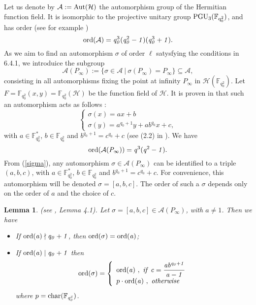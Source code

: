\documentclass[10pt]{article}
\newtheorem{lem1}{Lemma}[]
\newcommand{\s}{\vspace{0.3cm}}
\newcommand{\cd}{\cdot}
\newcommand{\calA}{\mathcal{A}}
\newcommand{\calH}{\mathcal{H}}
\newcommand{\su}{\subseteq}
\begin{document}
Let us denote by $\calA := \rm Aut(\calH)$ the automorphism group of the Hermitian function field. It is isomorphic to the projective unitary group $\rm PGU_3(\mathbb{F}_{q_0^2})$, and has order (see for example \cite{Sti})
\[\rm ord \it (\calA) =  q_0^{\rm 3}\it (q_0^{\rm 2}-1)(\it q_0^{\rm 3}+1).\]
As we aim to find an automorphism $\sigma$ of order $\ell$ satysfying the conditions in 6.4.1, we introduice the subgroup
\[\calA(P_{\infty}) := \{ \sigma \in \calA \ | \ \sigma(P_{\infty}) = P_{\infty}\} \su \calA ,\]
consisting in all automorphisms fixing the point at infinity $P_{\infty}$ in $\calH(\mathbb{F}_{q_0^2})$. Let $F=\mathbb{F}_{q_0^2}(x,y)=\mathbb{F}_{q_0^2}(\calH)$ be the function field of $\calH$. It is proven in \cite{Gar} that such an automorphism acts as follows :
\begin{equation} \label{sigma}
\left\{ \begin{array}{ll}
\sigma(x) = ax+b \\
\sigma(y) = a^{q_0+1}y+ab^{q_0}x+c,
\end{array} \right.
\end{equation}
with $a \in \mathbb{F}_{q_0^2}^*$, $b \in \mathbb{F}_{q_0^2}$ and $b^{q_0+1} = c^{q_0}+c$ (see (2.2) in \cite{Gar}). We have 
\[\rm ord \it (\calA(P_{\infty})) = q^{\rm 3}\it (q^{\rm 2}-1).\]
From (\ref{sigma}), any automorphism $\sigma \in \calA(P_{\infty})$ can be identified to a triple $(a,b,c)$, with $a \in \mathbb{F}_{q_0^2}^*$, $b \in \mathbb{F}_{q_0^2}$ and $b^{q_0+1} = c^{q_0}+c$. For convenience, this automorphism will be denoted $\sigma = [a,b,c]$. The order of such a $\sigma$ depends only on the order of $a$ and the choice of $c$.

\s

\begin{lem1} \rm (see \cite{Gar}, Lemma 4.1). \it \label{ordsigma}
Let $\sigma = [a,b,c] \in \calA(P_{\infty})$, with $a \neq 1$. Then we have
\begin{itemize}
\item[(i)] If $\rm ord \it (a) \nmid q_0+1$, then $\rm ord \it (\sigma) = \rm ord \it (a)$;
\item[(ii)] If $\rm ord \it (a) \mid q_0+1$ then
\begin{equation*}
\rm ord \it (\sigma) = \left\{ \begin{array}{ll}
\rm ord \it (a) \ , \ if \ c=\dfrac{ab^{q_0+1}}{a-1} \\
p \cd \rm ord \it (a) \ , \  otherwise \ 
\end{array}
\right.
\end{equation*}
where $p=\rm char \it (\mathbb{F}_{q_0^2})$.
\end{itemize}
\end{lem1}
\end{document}
